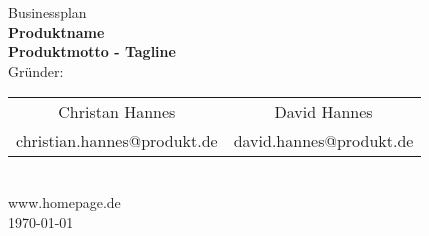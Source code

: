 \begin{center}
\Large Businessplan\\[3cm]
\LARGE {\textbf{Produktname\\[0.5cm] Produktmotto - Tagline}}\\[3cm] 
\Large	
Gr\"under:\\[0.5cm]
\begin{tabular}{cc}
Christan Hannes & David Hannes\\
{\small christian.hannes@produkt.de} & {\small david.hannes@produkt.de}
\end{tabular}\\[1cm]	
www.homepage.de\\[3cm]
\today

\end{center}